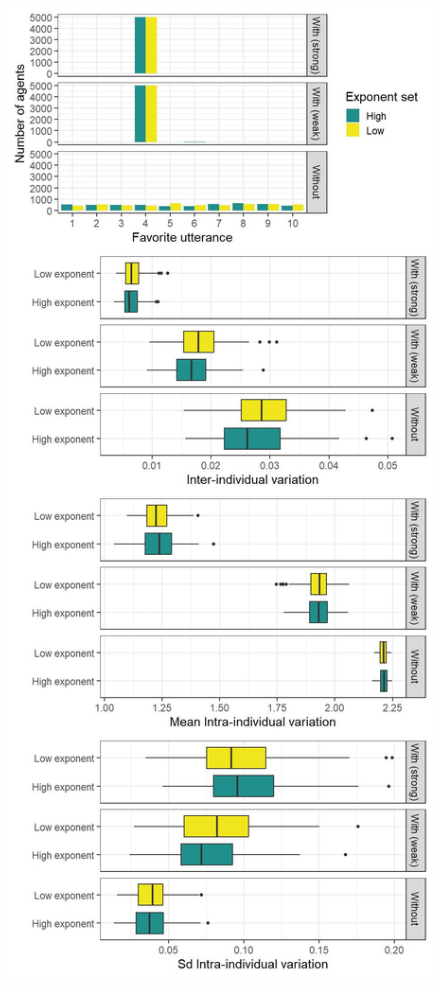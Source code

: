\documentclass[
]{article}
\begin{document}
\begin{figure}[!H]

{\centering \includegraphics{./Figures/unnamed-chunk-14-1} 

}


\end{figure}
\end{document}
